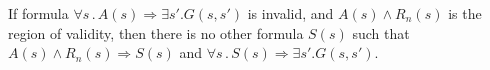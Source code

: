 \begin{lemma}
If formula $\forall s \,.\,  A(s) \Rightarrow \exists s' . G(s,s')$ is invalid, and $A(s) \land R_n(s)$ is the region of validity, then there is no other formula $S(s)$ such that $A(s) \land R_n(s) \Rightarrow S(s)$ and $\forall s \,.\,  S(s) \Rightarrow \exists s' . G(s,s')$.

\label{lem:subset}
\end{lemma}
